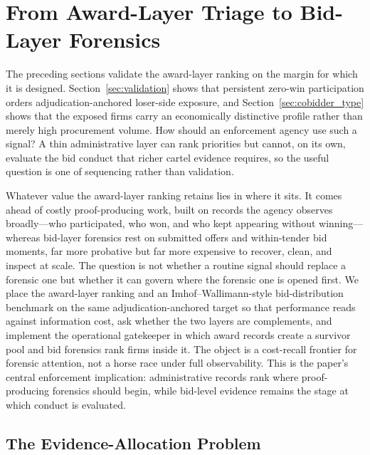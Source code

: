 \section{From Award-Layer Triage to Bid-Layer Forensics}
\label{sec:screening_forensics}

The preceding sections validate the award-layer ranking on the margin
for which it is designed. Section~\ref{sec:validation} shows that
persistent zero-win participation orders adjudication-anchored
loser-side exposure, and Section~\ref{sec:cobidder_type} shows that the
exposed firms carry an economically distinctive profile rather than
merely high procurement volume. How should an enforcement agency use
such a signal? A thin administrative layer can rank priorities but
cannot, on its own, evaluate the bid conduct that richer cartel
evidence requires, so the useful question is one of sequencing rather
than validation.

%
Whatever value the award-layer ranking retains lies in where it sits.
It comes ahead of costly proof-producing work, built on records the
agency observes broadly---who participated, who won, and who kept
appearing without winning---whereas bid-layer forensics rest on
submitted offers and within-tender bid moments, far more probative but
far more expensive to recover, clean, and inspect at scale. The
question is not whether a routine signal should replace a forensic one
but whether it can govern where the forensic one is opened first. We
place the award-layer ranking and an Imhof--Wallimann-style
bid-distribution benchmark on the same adjudication-anchored target so
that performance reads against information cost, ask whether the two
layers are complements, and implement the operational gatekeeper in
which award records create a survivor pool and bid forensics rank firms
inside it. The object is a cost-recall frontier for forensic attention,
not a horse race under full observability. This is the paper's central
enforcement implication: administrative records rank where
proof-producing forensics should begin, while bid-level evidence
remains the stage at which conduct is evaluated.

\subsection{The Evidence-Allocation Problem}
\label{sec:evidence_allocation}


